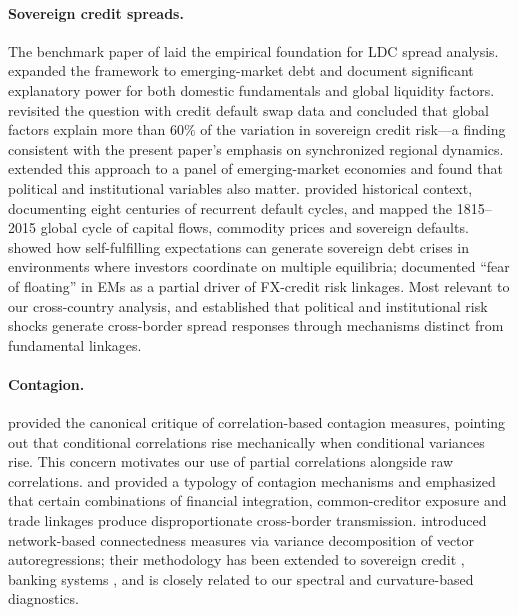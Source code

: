 \documentclass[12pt,a4paper]{article}
\begin{document}
\paragraph{Sovereign credit spreads.}
The benchmark paper of \citet{Edwards1984} laid the empirical foundation for
LDC spread analysis. \citet{EichengreenMody1998} expanded the framework to
emerging-market debt and document significant explanatory power for both
domestic fundamentals and global liquidity factors. \citet{Longstaff2011}
revisited the question with credit default swap data and concluded that
global factors explain more than 60\% of the variation in sovereign credit
risk---a finding consistent with the present paper's emphasis on synchronized
regional dynamics. \citet{Hilscher2010} extended this approach to a
panel of emerging-market economies and found that political and
institutional variables also matter. \citet{Reinhart2009} provided historical
context, documenting eight centuries of recurrent default cycles, and
\citet{Reinhart2016} mapped the 1815--2015 global cycle of capital flows,
commodity prices and sovereign defaults. \citet{Calvo1988} showed how
self-fulfilling expectations can generate sovereign debt crises in environments
where investors coordinate on multiple equilibria; \citet{CalvoReinhart2002}
documented ``fear of floating'' in EMs as a partial driver of FX-credit risk
linkages. Most relevant to our cross-country analysis,
\citet{BekaertHarvey2014} and \citet{Bekaert2014ContagionEquity}
established that political and institutional risk shocks generate cross-border
spread responses through mechanisms distinct from fundamental linkages.

\paragraph{Contagion.}
\citet{ForbesRigobon2002} provided the canonical critique of correlation-based
contagion measures, pointing out that conditional correlations rise
mechanically when conditional variances rise. This concern motivates our use
of partial correlations alongside raw correlations.
\citet{KaminskyReinhart2000} and \citet{KaminskyReinhartVegh2003} provided a
typology of contagion mechanisms and emphasized that certain combinations of
financial integration, common-creditor exposure and trade linkages produce
disproportionate cross-border transmission. \citet{Diebold2014} introduced
network-based connectedness measures via variance decomposition of vector
autoregressions; their methodology has been extended to sovereign credit
\citep{Glasserman2016}, banking systems \citep{HaldaneMay2011, Acemoglu2015},
and is closely related to our spectral and curvature-based diagnostics.
\end{document}
